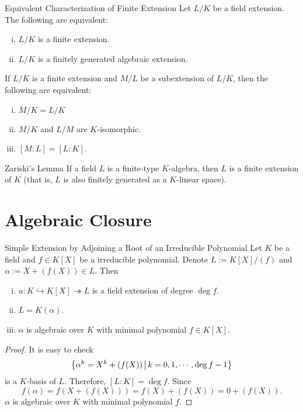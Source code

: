 \begin{proposition}{Equivalent Characterization of Finite Extension}{}
    Let $L/K$ be a field extension. The following are equivalent:
    \begin{enumerate}[(i)]
        \item $L/K$ is a finite extension.
        \item $L/K$ is a finitely generated algebraic extension.
    \end{enumerate}
\end{proposition}

\begin{proposition}{}{}
    If $L/K$ is a finite extension and $M/L$ be a subextension of $L/K$, then the following are equivalent:
    \begin{enumerate}[(i)]
        \item $M/K=L/K$
        \item $M/K$ and $L/M$ are $K$-isomorphic.
        \item $[M:L]=[L:K]$.
    \end{enumerate}
\end{proposition}

\begin{lemma}{Zariski's Lemma}{}
    If a field $L$ is a finite-type $K$-algebra, then $L$ is a finite extension of $K$ (that is, $L$ is also finitely generated as a $K$-linear space).
\end{lemma}

\section{Algebraic Closure}

\begin{proposition}{Simple Extension by Adjoining a Root of an Irreducible Polynomial}{}
    Let $K$ be a field and $f\in K[X]$ be a irreducible polynomial. Denote $L:=K[X]/(f)$ and $\alpha:=X+(f(X))\in L$. Then
    \begin{enumerate}[(i)]
        \item $u:K\hookrightarrow K[X]\twoheadrightarrow L$ is a field extension of degree $\deg f$.
        \item $L=K(\alpha)$.
        \item $\alpha$ is algebraic over $K$ with minimal polynomial $f\in K[X]$.
    \end{enumerate}  
\end{proposition}
\begin{proof}
    It is easy to check 
    \[
    \left\{\alpha^k=X^k+(f(X))\,\middle\vert\, k=0,1,\cdots, \deg f-1\right\}
    \]
    is a $K$-basis of $L$. Therefore, $[L:K]=\deg f$. Since 
    \[
        f(\alpha)=f(X+(f(X)))=f(X)+(f(X))=0+(f(X)).
    \]
    $\alpha$ is algebraic over $K$ with minimal polynomial $f$.
\end{proof}

